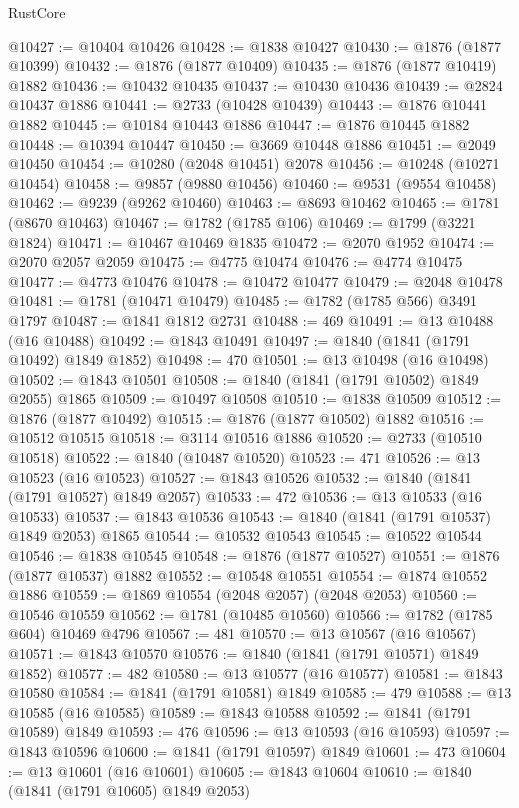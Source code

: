 \begin{lexlean}{RustCore}
\begin{coremodule}
@10427 := @10404 @10426
@10428 := @1838 @10427
@10430 := @1876 (@1877 @10399)
@10432 := @1876 (@1877 @10409)
@10435 := @1876 (@1877 @10419) @1882
@10436 := @10432 @10435
@10437 := @10430 @10436
@10439 := @2824 @10437 @1886
@10441 := @2733 (@10428 @10439)
@10443 := @1876 @10441 @1882
@10445 := @10184 @10443 @1886
@10447 := @1876 @10445 @1882
@10448 := @10394 @10447
@10450 := @3669 @10448 @1886
@10451 := @2049 @10450
@10454 := @10280 (@2048 @10451) @2078
@10456 := @10248 (@10271 @10454)
@10458 := @9857 (@9880 @10456)
@10460 := @9531 (@9554 @10458)
@10462 := @9239 (@9262 @10460)
@10463 := @8693 @10462
@10465 := @1781 (@8670 @10463)
@10467 := @1782 (@1785 @106)
@10469 := @1799 (@3221 @1824)
@10471 := @10467 @10469 @1835
@10472 := @2070 @1952
@10474 := @2070 @2057 @2059
@10475 := @4775 @10474
@10476 := @4774 @10475
@10477 := @4773 @10476
@10478 := @10472 @10477
@10479 := @2048 @10478
@10481 := @1781 (@10471 @10479)
@10485 := @1782 (@1785 @566) @3491 @1797
@10487 := @1841 @1812 @2731
@10488 := 469
@10491 := @13 @10488 (@16 @10488)
@10492 := @1843 @10491
@10497 := @1840 (@1841 (@1791 @10492) @1849 @1852)
@10498 := 470
@10501 := @13 @10498 (@16 @10498)
@10502 := @1843 @10501
@10508 := @1840 (@1841 (@1791 @10502) @1849 @2055) @1865
@10509 := @10497 @10508
@10510 := @1838 @10509
@10512 := @1876 (@1877 @10492)
@10515 := @1876 (@1877 @10502) @1882
@10516 := @10512 @10515
@10518 := @3114 @10516 @1886
@10520 := @2733 (@10510 @10518)
@10522 := @1840 (@10487 @10520)
@10523 := 471
@10526 := @13 @10523 (@16 @10523)
@10527 := @1843 @10526
@10532 := @1840 (@1841 (@1791 @10527) @1849 @2057)
@10533 := 472
@10536 := @13 @10533 (@16 @10533)
@10537 := @1843 @10536
@10543 := @1840 (@1841 (@1791 @10537) @1849 @2053) @1865
@10544 := @10532 @10543
@10545 := @10522 @10544
@10546 := @1838 @10545
@10548 := @1876 (@1877 @10527)
@10551 := @1876 (@1877 @10537) @1882
@10552 := @10548 @10551
@10554 := @1874 @10552 @1886
@10559 := @1869 @10554 (@2048 @2057) (@2048 @2053)
@10560 := @10546 @10559
@10562 := @1781 (@10485 @10560)
@10566 := @1782 (@1785 @604) @10469 @4796
@10567 := 481
@10570 := @13 @10567 (@16 @10567)
@10571 := @1843 @10570
@10576 := @1840 (@1841 (@1791 @10571) @1849 @1852)
@10577 := 482
@10580 := @13 @10577 (@16 @10577)
@10581 := @1843 @10580
@10584 := @1841 (@1791 @10581) @1849
@10585 := 479
@10588 := @13 @10585 (@16 @10585)
@10589 := @1843 @10588
@10592 := @1841 (@1791 @10589) @1849
@10593 := 476
@10596 := @13 @10593 (@16 @10593)
@10597 := @1843 @10596
@10600 := @1841 (@1791 @10597) @1849
@10601 := 473
@10604 := @13 @10601 (@16 @10601)
@10605 := @1843 @10604
@10610 := @1840 (@1841 (@1791 @10605) @1849 @2053)

\end{coremodule}
\end{lexlean}
